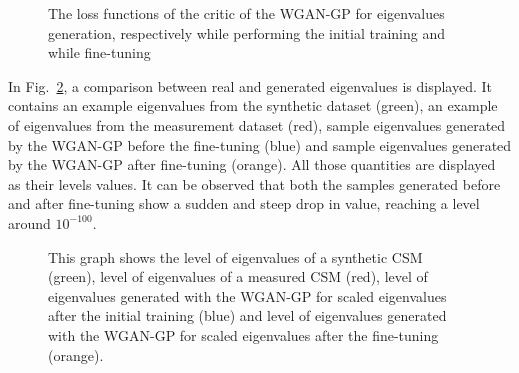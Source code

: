 \documentclass[11pt,a4paper,twoside]{report}
\begin{document}
\begin{figure}
    \centering
    \caption{The loss functions of the critic of the WGAN-GP for eigenvalues generation, respectively while performing the initial training and while fine-tuning}
    \label{fig:loss_evals_wgangp}
\end{figure}

In Fig.~\ref{fig:samples_evals_wgangp}, a comparison between real and generated eigenvalues is displayed. It contains an example eigenvalues from the synthetic dataset (green), an example of eigenvalues from the measurement dataset (red), sample eigenvalues generated by the WGAN-GP before the fine-tuning (blue) and sample eigenvalues generated by the WGAN-GP after fine-tuning (orange). All those quantities are displayed as their levels values. It can be observed that both the samples generated before and after fine-tuning show a sudden and steep drop in value, reaching a level around $10^{-100}$.

\begin{figure}
    \centering
    \caption{This graph shows the level of eigenvalues of a synthetic CSM (green), level of eigenvalues of a measured CSM (red), level of eigenvalues generated with the WGAN-GP for scaled eigenvalues after the initial training (blue) and level of eigenvalues generated with the WGAN-GP for scaled eigenvalues after the fine-tuning (orange).}
    \label{fig:samples_evals_wgangp}
\end{figure}
\end{document}
